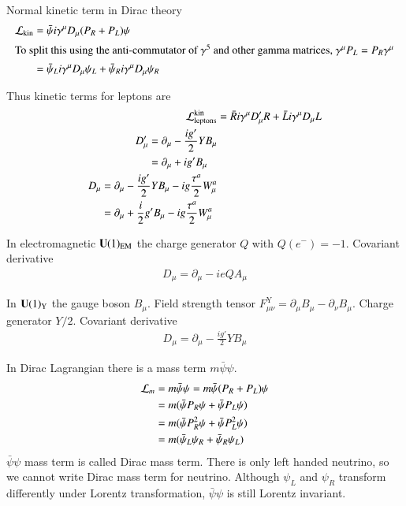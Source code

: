 Normal kinetic term in Dirac theory
\begin{align*}
   \mathcal{L}_\text{kin} &= \bar\psi i \gamma^\mu D_\mu (P_R + P_L) \psi \\
   \shortintertext{To split this using the anti-commutator of $\gamma^5$ and other gamma matrices, $\gamma^\mu P_L = P_R \gamma^\mu$}
                   &= \bar\psi_L i \gamma^\mu D_\mu \psi_L + \bar\psi_R i \gamma^\mu D_\mu \psi_R
\end{align*}

Thus kinetic terms for leptons are
\begin{align}
   \mathcal{L}_{\text{leptons}}^{\text{kin}} &= \bar{R} i \gamma^\mu D'_\mu R + \bar{L} i \gamma^\mu D_\mu L  \\
   \begin{split}
    D'_\mu &= \partial_\mu - \frac{ig'}{2} Y B_\mu  \\
          &= \partial_\mu + ig' B_\mu 
   \end{split} \\
   \begin{split}
    D_\mu &= \partial_\mu - \frac{ig'}{2}Y B_\mu - ig \frac{\tau^a}{2} W^a_\mu \\
         &= \partial_\mu + \frac{i}{2} g' B_\mu - ig \frac{\tau^a}{2} W_\mu^a
   \end{split}
\end{align}


In electromagnetic $\mathbf{U}(1)_\text{EM}$ the charge generator $Q$ with $Q(e^-) = -1$. Covariant derivative
\begin{align}
   D_\mu = \partial_\mu - ie Q A_\mu
\end{align}

In $\mathbf{U}(1)_\text{Y}$ the gauge boson $B_\mu$. Field strength tensor $F^\text{Y}_{\mu\nu} = \partial_\mu B_\mu - \partial_\nu B_\mu$. Charge generator $Y/2$. Covariant derivative 
\begin{align}
   D_\mu = \partial_\mu - \frac{ig'}{2} Y B_\mu
\end{align}

In Dirac Lagrangian there is a mass term $m\bar\psi \psi$.
\begin{align*}
   \mathcal{L}_m &= m\bar\psi \psi = m \bar\psi (P_R + P_L) \psi \\
          &= m (\bar\psi P_R \psi + \bar\psi P_L \psi) \\
          &= m (\bar\psi P_R^2 \psi + \bar\psi P_L^2 \psi) \\
          &= m (\bar\psi_L \psi_R + \bar \psi_R \psi_L)
\end{align*}
$\bar\psi \psi$ mass term is called Dirac mass term. There is only left handed neutrino, so we cannot write Dirac mass term for neutrino.  Although $\psi_L$ and $\psi_R$ transform differently under Lorentz transformation, $\bar\psi \psi$ is still Lorentz invariant.

